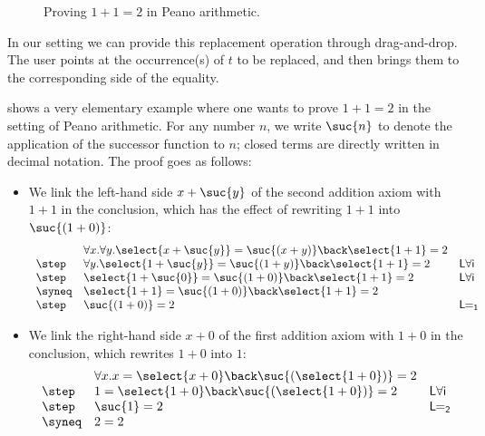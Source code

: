 \begin{figure*}
  \begin{center}
  \end{center}
  \caption{Proving $1 + 1 = 2$ in Peano arithmetic.}
\end{figure*}

In our setting we can provide this replacement operation through
drag-and-drop. The user points at the occurrence(s) of $t$ to be
replaced, and then brings them to the corresponding side of the
equality.

 shows a very elementary example where one wants to
prove $1+1=2$ in the setting of Peano arithmetic. For any number $n$, we write
$\suc{n}$ to denote the application of the successor function to $n$; closed
terms are directly written in decimal notation. The proof goes as
follows:
\begin{itemize}
  \item We link the left-hand side $x + \suc{y}$ of the second addition axiom with $1 + 1$ in the conclusion, which has the effect of rewriting $1 + 1$ into $\suc{(1 + 0)}$:
    $$
      \begin{array}{lll}
        & \forall x. \forall y. \select{x + \suc{y}} = \suc{(x + y)} \back \select{1 + 1} = 2 & \\
        \step & \forall y. \select{1 + \suc{y}} = \suc{(1 + y)} \back \select{1 + 1} = 2 &\mathsf{L\forall i} \\
        \step & \select{1 + \suc{0}} = \suc{(1 + 0)} \back \select{1 + 1} = 2 &\mathsf{L\forall i} \\
        \syneq & \select{1 + 1} = \suc{(1 + 0)} \back \select{1 + 1} = 2 & \\
        \step & \suc{(1 + 0)} = 2 &\mathsf{L\!\!=_1}
      \end{array}
    $$
  \item We link the right-hand side $x + 0$ of the first addition axiom with $1 + 0$ in the conclusion, which rewrites $1 + 0$ into $1$:
    $$
      \begin{array}{lll}
        & \forall x. x = \select{x + 0} \back \suc{(\select{1 + 0})} = 2 & \\
        \step & 1 = \select{1 + 0} \back \suc{(\select{1 + 0})} = 2 &\mathsf{L\forall i} \\
        \step & \suc{1} = 2 &\mathsf{L\!\!=_2} \\
        \syneq & 2 = 2 &
      \end{array}
    $$
\end{itemize}

